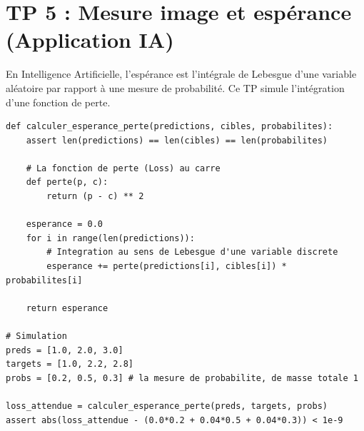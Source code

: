 \documentclass[11pt,a4paper]{article}
\begin{document}
\section{TP 5 : Mesure image et espérance (Application IA)}

En Intelligence Artificielle, l'espérance est l'intégrale de Lebesgue d'une variable aléatoire par rapport à une mesure de probabilité. Ce TP simule l'intégration d'une fonction de perte.

\begin{lstlisting}
def calculer_esperance_perte(predictions, cibles, probabilites):
    assert len(predictions) == len(cibles) == len(probabilites)

    # La fonction de perte (Loss) au carre
    def perte(p, c):
        return (p - c) ** 2

    esperance = 0.0
    for i in range(len(predictions)):
        # Integration au sens de Lebesgue d'une variable discrete
        esperance += perte(predictions[i], cibles[i]) * probabilites[i]

    return esperance

# Simulation
preds = [1.0, 2.0, 3.0]
targets = [1.0, 2.2, 2.8]
probs = [0.2, 0.5, 0.3] # la mesure de probabilite, de masse totale 1

loss_attendue = calculer_esperance_perte(preds, targets, probs)
assert abs(loss_attendue - (0.0*0.2 + 0.04*0.5 + 0.04*0.3)) < 1e-9
\end{lstlisting}
\end{document}
